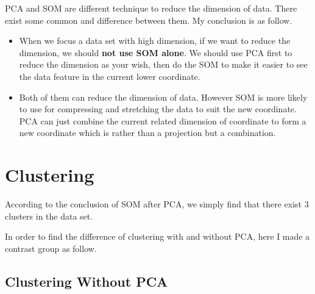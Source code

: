 \documentclass[titlepage,a4paper,12pt,thmsb]{report}
\begin{document}
PCA and SOM are different technique to reduce the dimension of data. There exist some common and difference between them. My conclusion is as follow.

\begin{itemize}
\item{When we focus a data set with high dimension, if we want to reduce the dimension, we should  {\bf not use SOM alone}. We should use PCA first to reduce the dimension as your wish, then do the SOM to make it easier to see the data feature in the current lower coordinate.}
\item{Both of them can reduce the dimension of data. However SOM is more likely to use for compressing and stretching the data to suit the new coordinate. PCA can just combine the current related dimension of  coordinate to form a new coordinate which is rather than a projection but a  combination. }
\end{itemize}

\newpage

\section{Clustering}
According to the conclusion of SOM after PCA, we simply find that there exist 3 clusters in the data set.

In order to find the difference of clustering with and without PCA, here I made a contrast group as follow.


\subsection{Clustering Without PCA}

\begin{center}
\begin{figure}[h]
{\par}
\end{figure}
{}
\end{center}

\newpage


\begin{center}
\begin{figure}[h]
{\par}
\end{figure}
{}
\end{center}
\end{document}
